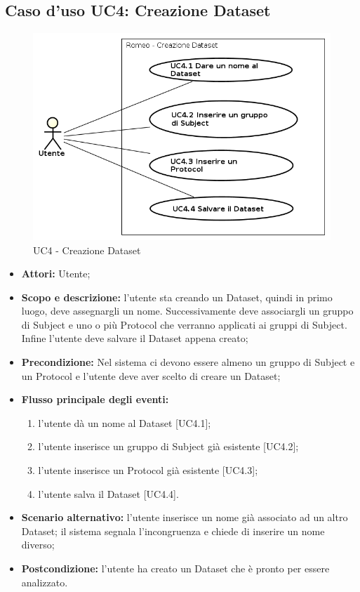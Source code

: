 \subsection{Caso d'uso UC4: Creazione Dataset}
\begin{figure}[!h]
\begin{center}
\includegraphics[scale=0.6]{./img/Use_Case/UC4}
\caption{UC4 - Creazione Dataset}
\end{center}
\end{figure}
\begin{itemize}
\item \textbf{Attori:} Utente;
\item \textbf{Scopo e descrizione:} l'utente sta creando un Dataset\glossario{}, quindi in primo luogo, deve assegnargli un nome. Successivamente deve associargli un gruppo di Subject\glossario{} e uno o più Protocol\glossario{} che verranno applicati ai gruppi di Subject\glossario{}. Infine l'utente deve salvare il Dataset\glossario{} appena creato;
\item \textbf{Precondizione:} Nel sistema ci devono essere almeno un gruppo di Subject\glossario{} e un Protocol\glossario{} e l'utente deve aver scelto di creare un Dataset\glossario{};
\item \textbf{Flusso principale degli eventi:} 
\begin{enumerate}
\item l'utente dà un nome al Dataset\glossario{} [UC4.1];
\item l'utente inserisce un gruppo di Subject\glossario{} già esistente [UC4.2];
\item l'utente inserisce un Protocol\glossario{} già esistente [UC4.3];
\item l'utente salva il Dataset\glossario{} [UC4.4].
\end{enumerate}
\item \textbf{Scenario alternativo:} l'utente inserisce un nome già associato ad un altro Dataset\glossario{}; il sistema segnala l'incongruenza e chiede di inserire un nome diverso;
\item \textbf{Postcondizione:} l'utente ha creato un Dataset\glossario{} che è pronto per essere analizzato.
\end{itemize}

